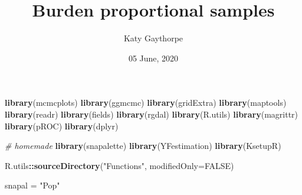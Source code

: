 \documentclass[
]{article}
\title{Burden proportional samples}
\author{Katy Gaythorpe}
\date{05 June, 2020}
\newenvironment{Shaded}{\begin{snugshade}}{\end{snugshade}}
\newcommand{\CommentTok}[1]{\textcolor[rgb]{0.56,0.35,0.01}{\textit{#1}}}
\newcommand{\DataTypeTok}[1]{\textcolor[rgb]{0.13,0.29,0.53}{#1}}
\newcommand{\DecValTok}[1]{\textcolor[rgb]{0.00,0.00,0.81}{#1}}
\newcommand{\KeywordTok}[1]{\textcolor[rgb]{0.13,0.29,0.53}{\textbf{#1}}}
\newcommand{\NormalTok}[1]{#1}
\newcommand{\OperatorTok}[1]{\textcolor[rgb]{0.81,0.36,0.00}{\textbf{#1}}}
\newcommand{\OtherTok}[1]{\textcolor[rgb]{0.56,0.35,0.01}{#1}}
\newcommand{\StringTok}[1]{\textcolor[rgb]{0.31,0.60,0.02}{#1}}
\begin{document}
\maketitle

\begin{Shaded}
\begin{Highlighting}[]
\KeywordTok{library}\NormalTok{(mcmcplots)}
\KeywordTok{library}\NormalTok{(ggmcmc)}
\KeywordTok{library}\NormalTok{(gridExtra)}
\KeywordTok{library}\NormalTok{(maptools)}
\KeywordTok{library}\NormalTok{(readr)}
\KeywordTok{library}\NormalTok{(fields)}
\KeywordTok{library}\NormalTok{(rgdal)}
\KeywordTok{library}\NormalTok{(R.utils)}
\KeywordTok{library}\NormalTok{(magrittr)}
\KeywordTok{library}\NormalTok{(pROC)}
\KeywordTok{library}\NormalTok{(dplyr)}

\CommentTok{# homemade}
\KeywordTok{library}\NormalTok{(snapalette)}
\KeywordTok{library}\NormalTok{(YFestimation)}
\KeywordTok{library}\NormalTok{(KsetupR)}

\NormalTok{R.utils}\OperatorTok{::}\KeywordTok{sourceDirectory}\NormalTok{(}\StringTok{"Functions"}\NormalTok{, }\DataTypeTok{modifiedOnly=}\OtherTok{FALSE}\NormalTok{)}

\NormalTok{snapal =}\StringTok{ "Pop"}
\end{Highlighting}
\end{Shaded}

\begin{Shaded}
\end{Shaded}
\end{document}
